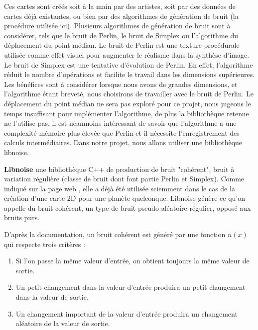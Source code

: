 \documentclass[12pt]{report}
\begin{document}
Ces cartes sont créés soit à la main par des artistes, soit par des données de cartes déjà existantes, ou bien par des algorithmes de génération de bruit (la procédure utilisée ici).
Plusieurs algorithmes de génération de bruit sont à considérer, tels que le bruit de Perlin, le bruit de Simplex ou l'algorithme du déplacement du point médian. 
Le bruit de Perlin est une texture procédurale utilisée comme effet visuel pour augmenter le réalisme dans la synthèse d'image.
Le bruit de Simplex est une tentative d'évolution de Perlin. En effet, l'algorithme réduit le nombre d'opérations et facilite le travail dans les dimensions supérieures. Les bénéfices sont à considérer lorsque nous avons de grandes dimensions, et l'algorithme étant breveté, nous choisirons de travailler avec le bruit de Perlin. 
Le déplacement du point médian ne sera pas exploré pour ce projet, nous jugeons le temps insuffisant pour implémenter l'algorithme, de plus la bibliothèque retenue ne l'utilise pas, il est néanmoins intéressant de savoir que l'algorithme a une complexité mémoire plus élevée que Perlin et il nécessite l'enregistrement des calculs intermédiaires.
Dans notre projet, nous allons utiliser une bibliothèque libnoise.

\vspace{0.3cm}


    
    \textbf{Libnoise} une bibliothèque C++ de production de bruit "cohérent", bruit à variation régulière (classe de bruit dont font partie Perlin et Simplex). Comme indiqué sur la page web \cite{libnoisewebsite}, elle a déjà été utilisée sciemment dans le cas de la création d'une carte 2D pour une planète quelconque. Libnoise génère ce qu'on appelle du bruit cohérent, un type de bruit pseudo-aléatoire régulier, opposé aux bruits purs.
    
    D'après la documentation, un bruit cohérent est généré par une fonction $n(x)$ qui respecte trois critères :
    \begin{enumerate}
        \item Si l'on passe la même valeur d'entrée, on obtient toujours la même valeur de sortie.
        \item Un petit changement dans la valeur d'entrée produira un petit changement dans la valeur de sortie.
        \item Un changement important de la valeur d'entrée produira un changement aléatoire de la valeur de sortie.
    \end{enumerate}
    
\end{document}
